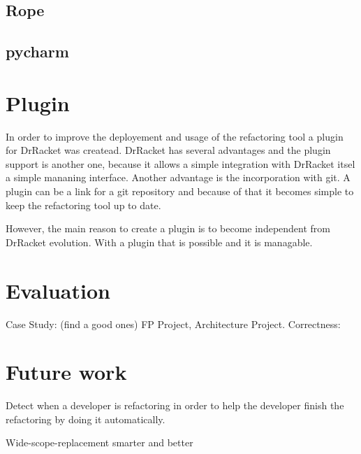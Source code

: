 \subsection{Rope}
\subsection{pycharm}

\section{Plugin}
In order to improve the deployement and usage of the refactoring tool a plugin
for DrRacket was createad.
DrRacket has several advantages and the plugin support is another one, because
it allows a simple integration with DrRacket itsel a simple mananing interface.
Another advantage is the incorporation with git. A plugin can be a link for a git
repository and because of that it becomes simple to keep the refactoring tool up to date.

However, the main reason to create a plugin is to become independent from DrRacket
evolution. With a plugin that is possible and it is managable.

\section{Evaluation}
Case Study: (find a good ones) FP Project, Architecture Project.
Correctness:
\section{Future work}
Detect when a developer is refactoring in order to help the developer finish the
refactoring by doing it automatically.

Wide-scope-replacement smarter and better
